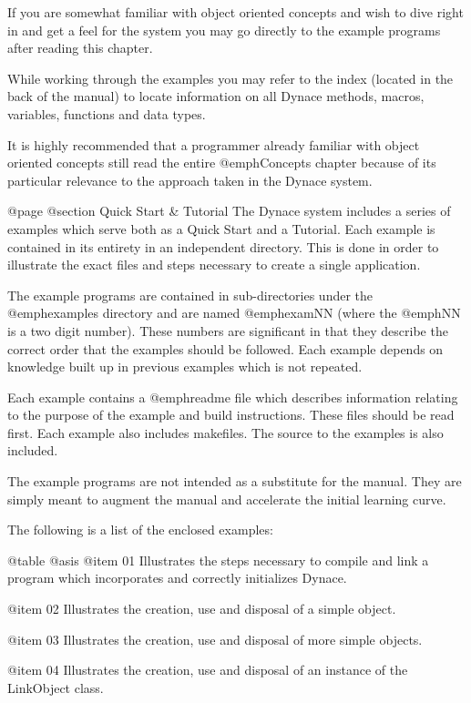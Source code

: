 If you are somewhat familiar with object oriented concepts and wish
to dive right in and get a feel for the system you may go directly
to the example programs after reading this chapter.

While working through the examples you may refer to the index (located
in the back of the manual) to locate information on all Dynace methods,
macros, variables, functions and data types.


It is highly recommended that a programmer already familiar with object
oriented concepts still read the entire @emph{Concepts} chapter because
of its particular relevance to the approach taken in the Dynace system.







@page
@section Quick Start & Tutorial
The Dynace system includes a series of examples which serve both as a
Quick Start and a Tutorial.  Each example is contained in its entirety
in an independent directory.  This is done in order to illustrate the
exact files and steps necessary to create a single application.

The example programs are contained in sub-directories under the
@emph{examples} directory and are named @emph{examNN} (where the
@emph{NN} is a two digit number).  These numbers are significant in that
they describe the correct order that the examples should be followed.
Each example depends on knowledge built up in previous examples which is
not repeated.

Each example contains a @emph{readme} file which describes information
relating to the purpose of the example and build instructions.  These
files should be read first.  Each example also includes makefiles.
The source to the examples is also included.

The example programs are not intended as a substitute for the manual.
They are simply meant to augment the manual and accelerate the initial
learning curve.

The following is a list of the enclosed examples:

@table @asis
@item 01
Illustrates the steps necessary to compile and link a program which
incorporates and correctly initializes Dynace.

@item 02
Illustrates the creation, use and disposal of a simple object.

@item 03
Illustrates the creation, use and disposal of more simple objects.

@item 04
Illustrates the creation, use and disposal of an instance of the
LinkObject class.

